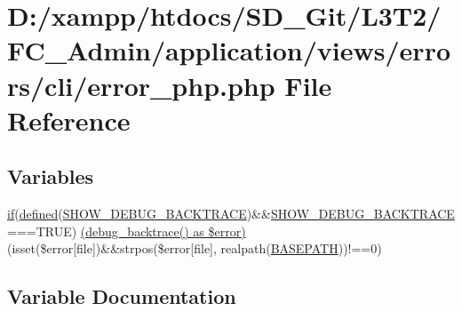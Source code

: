\hypertarget{_admin_2application_2views_2errors_2cli_2error__php_8php}{}\section{D\+:/xampp/htdocs/\+S\+D\+\_\+\+Git/\+L3\+T2/\+F\+C\+\_\+\+Admin/application/views/errors/cli/error\+\_\+php.php File Reference}
\label{_admin_2application_2views_2errors_2cli_2error__php_8php}
\subsection*{Variables}
\begin{DoxyCompactItemize}
\item 
\hyperlink{_admin_2assets_2js_2bootstrap_8min_8js_a87cf461060832b8b68a7b48d9e371e4f}{if}(\hyperlink{_admin_2tests_2_bootstrap_8php_a46458e8654a714e0565e20f63021add9}{defined}(\textquotesingle{}\hyperlink{_admin_2application_2config_2constants_8php_a7e2dd6fea73799257285946411aeb5ce}{S\+H\+O\+W\+\_\+\+D\+E\+B\+U\+G\+\_\+\+B\+A\+C\+K\+T\+R\+A\+C\+E}\textquotesingle{})\&\&\hyperlink{_admin_2application_2config_2constants_8php_a7e2dd6fea73799257285946411aeb5ce}{S\+H\+O\+W\+\_\+\+D\+E\+B\+U\+G\+\_\+\+B\+A\+C\+K\+T\+R\+A\+C\+E}===T\+R\+U\+E) \hyperlink{_admin_2application_2views_2errors_2cli_2error__php_8php_acf0b45c2a78b2e3c8689c4cfbe34a63f}{(debug\+\_\+backtrace() as \$error)} (isset(\$error\mbox{[}\textquotesingle{}file\textquotesingle{}\mbox{]})\&\&strpos(\$error\mbox{[}\textquotesingle{}file\textquotesingle{}\mbox{]}, realpath(\hyperlink{_admin_2index_8php_ad39801cabfd338dc5524466fe793fda9}{B\+A\+S\+E\+P\+A\+T\+H}))!==0)
\end{DoxyCompactItemize}


\subsection{Variable Documentation}
\hypertarget{_admin_2application_2views_2errors_2cli_2error__php_8php_acf0b45c2a78b2e3c8689c4cfbe34a63f}{}
